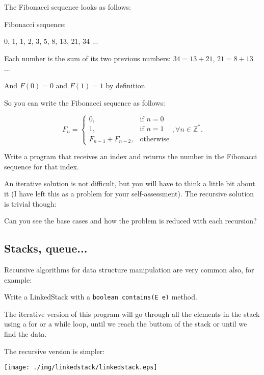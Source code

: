 \documentclass[a4paper, 9pt]{extarticle}
\begin{document}
The Fibonacci sequence looks as follows:

\begin{blackboard}
Fibonacci sequence:

  0, 1, 1, 2, 3, 5, 8, 13, 21, 34 ...
\end{blackboard}

Each number is the sum of its two previous numbers: $34 = 13 + 21$, $21 = 8 + 13$ ...

And $F(0) = 0$ and $F(1) = 1$ by definition.

So you can write the Fibonacci sequence as follows:

\begin{equation*}
  F_n =
  \begin{cases}
    0, & \text{if } n = 0\\
    1, & \text{if } n = 1\\
    F_{n-1} + F_{n-2}, & \text{otherwise}
  \end{cases}, \forall n \in \mathbb{Z}^{*}.
\end{equation*}

Write a program that receives an index and returns the number in the Fibonacci
sequence for that index.

An iterative solution is not difficult, but you will have to think a little bit
about it (I have left this as a problem for your self-assessment). The
recursive solution is trivial though:


Can you see the base cases and how the problem is reduced with each recursion?

\subsection{Stacks, queue...}

Recursive algorithms for data structure manipulation are very common also, for
example:

Write a LinkedStack with a \texttt{boolean contains(E e)} method.

The iterative version of this program will go through all the elements in the
stack using a for or a while loop, until we reach the buttom of the stack or
until we find the data.

The recursive version is simpler:

\begin{center}
\texttt{[image: ./img/linkedstack/linkedstack.eps]}
\end{center}
\end{document}
